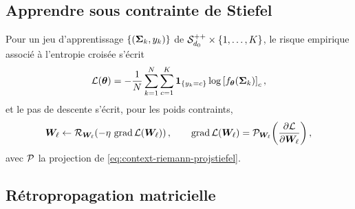 \subsection{Apprendre sous contrainte de Stiefel}
\label{sec:spdnet-apprentissage}


Pour un jeu d'apprentissage $\{(\boldsymbol{\Sigma}_k,y_k)\}$ de
$\mathcal{S}_{d_{0}}^{++}\times\{1,\dots,K\}$, le risque empirique associé à
l'entropie croisée s'écrit
\begin{equation}
  \mathcal{L}(\boldsymbol{\theta})
  =
  -\frac{1}{N}\sum_{k=1}^{N}\sum_{c=1}^{K}
  \mathbf{1}_{\{y_k=c\}}
  \log\left[f_{\boldsymbol{\theta}}(\boldsymbol{\Sigma}_k)\right]_c,
  \label{eq:spdnet-risque}
\end{equation}
et le pas de descente s'écrit, pour les poids contraints,
\begin{equation}
  \boldsymbol{W}_\ell
  \gets
  \mathcal{R}_{\boldsymbol{W}_\ell}\!\left(-\eta\,\operatorname{\operatorname{grad}}\mathcal{L}(\boldsymbol{W}_\ell)\right),
  \qquad
  \operatorname{\operatorname{grad}}\mathcal{L}(\boldsymbol{W}_\ell)
  =
  \mathcal{P}_{\boldsymbol{W}_\ell}\!\left(\frac{\partial \mathcal{L}}{\partial \boldsymbol{W}_\ell}\right),
  \label{eq:spdnet-descente}
\end{equation}
avec $\mathcal{P}$ la projection de \cref{eq:context-riemann-projstiefel}.

\subsection{Rétropropagation matricielle}
\label{sec:spdnet-backprop}

